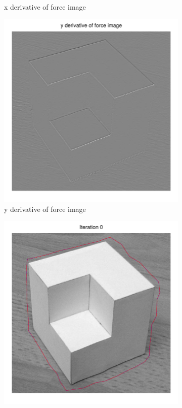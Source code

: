 \documentclass[11pt,a4paper]{article}
\begin{document}
\begin{figure}[H]
\begin{subfigure}[t]{0.21\textwidth}
        \caption{x derivative of force image}
        \label{fig:cubic_log_fx}
    \end{subfigure}
    \begin{subfigure}[t]{0.21\textwidth}
        \includegraphics[width=\textwidth]{src/images/cubic_log_yforces.pdf}
        \caption{y derivative of force image}
        \label{fig:cubic_log_fy}
    \end{subfigure}
    \begin{subfigure}[t]{0.21\textwidth}
        \includegraphics[width=\textwidth]{src/images/cubic_log_0.pdf}

\end{subfigure}
\end{figure}
\end{document}
